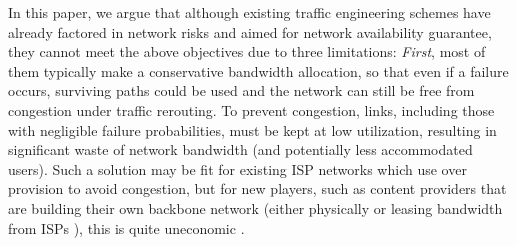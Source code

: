 \documentclass[sigconf]{acmart}
\begin{document}
In this paper, we argue that although existing traffic engineering schemes \cite{FFC,Teavar,R3,swan,PCF,B4,SMORE} have already factored in network risks and aimed for network availability guarantee, they cannot meet the above objectives due to three limitations:
\textit{First}, most of them \cite{FFC,R3,PCF,Teavar,SMORE} typically make a conservative bandwidth allocation, so that even if a failure occurs, surviving paths could be used and the network can still be free from congestion under traffic rerouting.
To prevent congestion, links, including those with negligible failure probabilities, must be kept at low utilization, 
resulting in significant waste of network bandwidth (and potentially less accommodated users). 
Such a solution may be fit for existing ISP networks which use over provision to avoid congestion, but for new players, such as content providers that are building their own backbone network (either physically \cite{B4,swan,amazon,evole} or leasing bandwidth from ISPs \cite{cato, aryaka}), this is quite uneconomic \cite{publicore}. 
\end{document}
